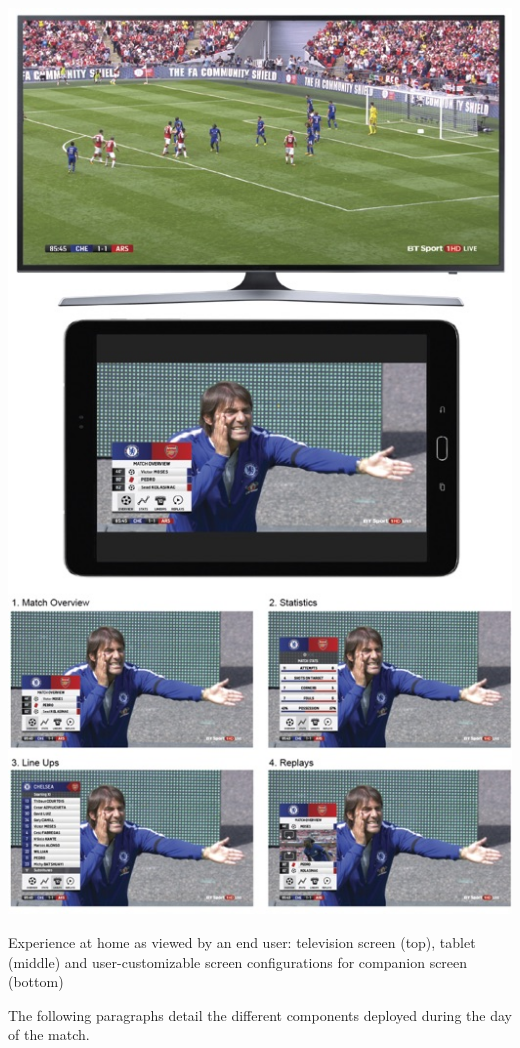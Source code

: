 \documentclass[sigchi-a, authorversion]{acmart}
\begin{document}
\begin{marginfigure}
    \includegraphics[width=\marginparwidth-10pt]{Figures/footballathome1.jpg}
    \caption{Experience at home as viewed by an end user: television screen (top), tablet (middle) and user-customizable screen configurations for companion screen (bottom)}
    \label{fig:homeexperience}
\end{marginfigure}

The following paragraphs detail the different components deployed during the day
of the match.
\end{document}
